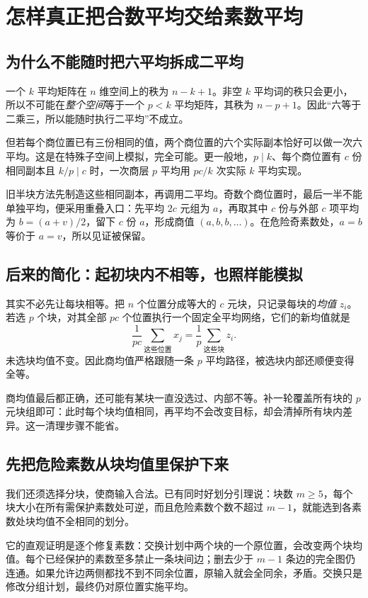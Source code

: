 \chapter{怎样真正把合数平均交给素数平均}\label{ch:transfer}
\section{为什么不能随时把六平均拆成二平均}
一个 $k$ 平均矩阵在 $n$ 维空间上的秩为 $n-k+1$。非空 $k$ 平均词的秩只会更小，所以不可能在\emph{整个空间}等于一个 $p<k$ 平均矩阵，其秩为 $n-p+1$。因此“六等于二乘三，所以能随时执行二平均”不成立。

但若每个商位置已有三份相同的值，两个商位置的六个实际副本恰好可以做一次六平均。这是在特殊子空间上模拟，完全可能。更一般地，$p\mid k$、每个商位置有 $c$ 份相同副本且 $k/p\mid c$ 时，一次商层 $p$ 平均用 $pc/k$ 次实际 $k$ 平均实现。

旧半块方法先制造这些相同副本，再调用二平均。奇数个商位置时，最后一半不能单独平均，便采用重叠入口：先平均 $2c$ 元组为 $a$，再取其中 $c$ 份与外部 $c$ 项平均为 $b=(a+v)/2$，留下 $c$ 份 $a$，形成商值 $(a,b,b,\ldots)$。在危险奇素数处，$a=b$ 等价于 $a=v$，所以见证被保留。

\section{后来的简化：起初块内不相等，也照样能模拟}
其实不必先让每块相等。把 $n$ 个位置分成等大的 $c$ 元块，只记录每块的\emph{均值} $z_i$。若选 $p$ 个块，对其全部 $pc$ 个位置执行一个固定全平均网络，它们的新均值就是
\[\frac1{pc}\sum_{\text{这些位置}}x_j=\frac1p\sum_{\text{这些块}}z_i.
\]
未选块均值不变。因此商均值严格跟随一条 $p$ 平均路径，被选块内部还顺便变得全等。

商均值最后都正确，还可能有某块一直没选过、内部不等。补一轮覆盖所有块的 $p$ 元块组即可：此时每个块均值相同，再平均不会改变目标，却会清掉所有块内差异。这一清理步骤不能省。

\section{先把危险素数从块均值里保护下来}
我们还须选择分块，使商输入合法。已有同时好划分引理说：块数 $m\ge5$，每个块大小在所有需保护素数处可逆，而且危险素数个数不超过 $m-1$，就能选到各素数处块均值不全相同的划分。

它的直观证明是逐个修复素数：交换计划中两个块的一个原位置，会改变两个块均值。每个已经保护的素数至多禁止一条块间边；删去少于 $m-1$ 条边的完全图仍连通。如果允许边两侧都找不到不同余位置，原输入就会全同余，矛盾。交换只是修改分组计划，最终仍对原位置实施平均。

